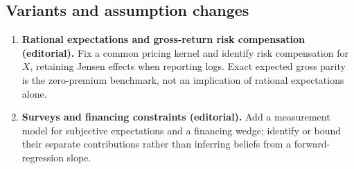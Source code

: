\documentclass[11pt,a4paper]{article}
\begin{document}
\subsection*{Variants and assumption changes}
\begin{enumerate}
\item \textbf{Rational expectations and gross-return risk compensation (editorial).} Fix a common pricing kernel and identify risk compensation for \(X\), retaining Jensen effects when reporting logs. Exact expected gross parity is the zero-premium benchmark, not an implication of rational expectations alone.
\item \textbf{Surveys and financing constraints (editorial).} Add a measurement model for subjective expectations and a financing wedge; identify or bound their separate contributions rather than inferring beliefs from a forward-regression slope.
\end{enumerate}
\end{document}
